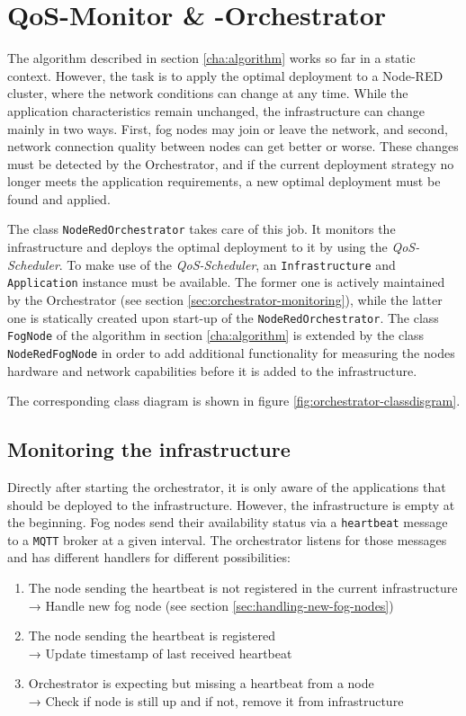 \chapter{QoS-Monitor \& -Orchestrator\label{cha:orchestrator}}

The algorithm described in section \ref{cha:algorithm} works so far in a static context. However, the task is to apply the optimal deployment to a Node-RED cluster, where the network conditions can change at any time. While the application characteristics remain unchanged, the infrastructure can change mainly in two ways. First, fog nodes may join or leave the network, and second, network connection quality between nodes can get better or worse. These changes must be detected by the Orchestrator, and if the current deployment strategy no longer meets the application requirements, a new optimal deployment must be found and applied.

The class \texttt{NodeRedOrchestrator} takes care of this job. It monitors the infrastructure and deploys the optimal deployment to it by using the \textit{QoS-Scheduler}. To make use of the \textit{QoS-Scheduler}, an \texttt{Infrastructure} and \texttt{Application} instance must be available. The former one is actively maintained by the Orchestrator (see section \ref{sec:orchestrator-monitoring}), while the latter one is statically created upon start-up of the \texttt{NodeRedOrchestrator}. The class \texttt{FogNode} of the algorithm in section \ref{cha:algorithm} is extended by the class \texttt{NodeRedFogNode} in order to add additional functionality for measuring the nodes hardware and network capabilities before it is added to the infrastructure.

The corresponding class diagram is shown in figure \ref{fig:orchestrator-classdisgram}.

\section{Monitoring the infrastructure\label{sec:orchestrator-monitoring}}

Directly after starting the orchestrator, it is only aware of the applications that should be deployed to the infrastructure. However, the infrastructure is empty at the beginning. Fog nodes send their availability status via a \texttt{heartbeat} message to a \texttt{MQTT} broker at a given interval. The orchestrator listens for those messages and has different handlers for different possibilities:
\begin{enumerate}
    \item The node sending the heartbeat is not registered in the current infrastructure\\
    → Handle new fog node (see section \ref{sec:handling-new-fog-nodes})
    \item The node sending the heartbeat is registered\\
    → Update timestamp of last received heartbeat
    \item Orchestrator is expecting but missing a heartbeat from a node\\
    → Check if node is still up and if not, remove it from infrastructure
\end{enumerate}

